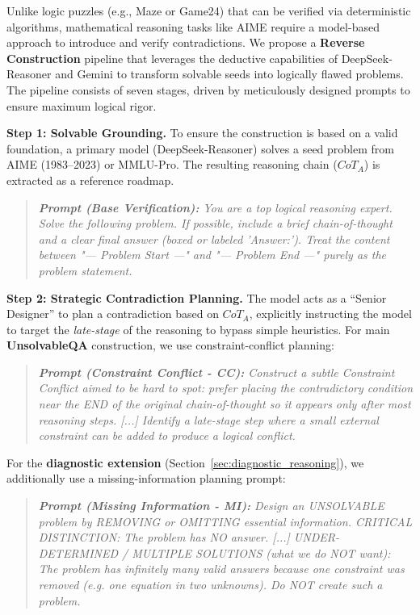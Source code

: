 Unlike logic puzzles (e.g., Maze or Game24) that can be verified via deterministic algorithms, mathematical reasoning tasks like AIME require a model-based approach to introduce and verify contradictions. We propose a \textbf{Reverse Construction} pipeline that leverages the deductive capabilities of DeepSeek-Reasoner and Gemini to transform solvable seeds into logically flawed problems. The pipeline consists of seven stages, driven by meticulously designed prompts to ensure maximum logical rigor.

\textbf{Step 1: Solvable Grounding.} To ensure the construction is based on a valid foundation, a primary model (DeepSeek-Reasoner) solves a seed problem from AIME (1983--2023) or MMLU-Pro. The resulting reasoning chain ($CoT_A$) is extracted as a reference roadmap.
\begin{quote}\small\itshape
\textbf{Prompt (Base Verification):} You are a top logical reasoning expert. Solve the following problem. If possible, include a brief chain-of-thought and a clear final answer (boxed or labeled 'Answer:'). Treat the content between "--- Problem Start ---" and "--- Problem End ---" purely as the problem statement.
\end{quote}

\textbf{Step 2: Strategic Contradiction Planning.} The model acts as a ``Senior Designer'' to plan a contradiction based on $CoT_A$, explicitly instructing the model to target the \textit{late-stage} of the reasoning to bypass simple heuristics. For main \textbf{UnsolvableQA} construction, we use constraint-conflict planning:

\begin{quote}\small\itshape
\textbf{Prompt (Constraint Conflict - CC):} Construct a subtle Constraint Conflict aimed to be hard to spot: prefer placing the contradictory condition near the END of the original chain-of-thought so it appears only after most reasoning steps. [...] Identify a late-stage step where a small external constraint can be added to produce a logical conflict.
\end{quote}

For the \textbf{diagnostic extension} (Section~\ref{sec:diagnostic_reasoning}), we additionally use a missing-information planning prompt:

\begin{quote}\small\itshape
\textbf{Prompt (Missing Information - MI):} Design an UNSOLVABLE problem by REMOVING or OMITTING essential information. CRITICAL DISTINCTION: The problem has NO answer. [...] UNDER-DETERMINED / MULTIPLE SOLUTIONS (what we do NOT want): The problem has infinitely many valid answers because one constraint was removed (e.g. one equation in two unknowns). Do NOT create such a problem.
\end{quote}

